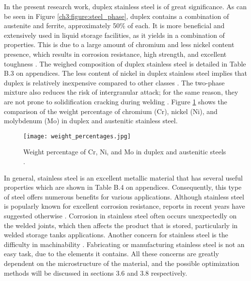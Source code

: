 In the present research work, duplex stainless steel is of great significance. As can be seen in Figure \ref{ch3:figure:steel_phase}, duplex contains a combination of austenite and ferrite, approximately 50\% of each. It is more beneficial and extensively used in liquid storage facilities, as it yields in a combination of properties. This is due to a large amount of chromium and less nickel content presence, which results in corrosion resistance, high strength, and excellent toughness \cite{gunn1997duplex}. The weighed composition of duplex stainless steel is detailed in Table B.3 on appendices. The less content of nickel in duplex stainless steel implies that duplex is relatively inexpensive compared to other classes \cite{sourmail2005stainless}. The two-phase mixture also reduces the risk of intergranular attack; for the same reason, they are not prone to solidification cracking during welding \cite{sourmail2005stainless}. Figure \ref{ch3:figure:weight} shows the comparison of the weight percentage of chromium (Cr), nickel (Ni), and molybdenum (Mo) in duplex and austenitic stainless steel.
 
\begin{figure}[H]
    \centering
    \texttt{[image: weight\_percentages.jpg]}
    \caption{Weight percentage of Cr, Ni, and Mo in duplex and austenitic steels \cite{sourmail2005stainless}.}
    \label{ch3:figure:weight}
\end{figure}

In general, stainless steel is an excellent metallic material that has several useful properties which are shown in Table B.4 on appendices. Consequently, this type of steel offers numerous benefits for various applications. Although stainless steel is popularly known for excellent corrosion resistance, reports in recent years have suggested otherwise \cite{karayan2014weld}. Corrosion in stainless steel often occurs unexpectedly on the welded joints, which then affects the product that is stored, particularly in welded storage tanks applications. Another concern for stainless steel is the difficulty in machinability \cite{grzesik2008advanced}. Fabricating or manufacturing stainless steel is not an easy task, due to the elements it contains. All these concerns are greatly dependent on the microstructure of the material, and the possible optimization methods will be discussed in sections 3.6 and 3.8 respectively.

